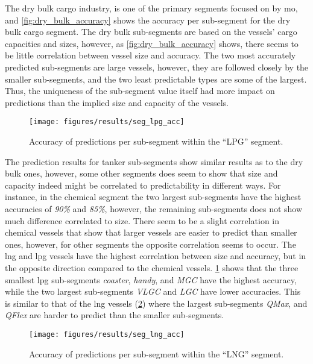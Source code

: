 The dry bulk cargo industry, is one of the primary segments focused on by \acrshort{mo}, and \cref{fig:dry_bulk_accuracy} shows the accuracy per sub-segment for the dry bulk cargo segment. The dry bulk sub-segments are based on the vessels' cargo capacities and sizes, however, as \cref{fig:dry_bulk_accuracy} shows, there seems to be little correlation between vessel size and accuracy. The two most accurately predicted sub-segments are large vessels, however, they are followed closely by the smaller sub-segments, and the two least predictable types are some of the largest. Thus, the uniqueness of the sub-segment value itself had more impact on predictions than the implied size and capacity of the vessels.

\begin{figure}[htbp]
    \centering
    \texttt{[image: figures/results/seg\_lpg\_acc]}
    \caption{Accuracy of predictions per sub-segment within the ``LPG'' segment.}
    \label{fig:lpg_accuracy}
\end{figure}

The prediction results for tanker sub-segments show similar results as to the dry bulk ones, however, some other segments does seem to show that size and capacity indeed might be correlated to predictability in different ways. For instance, in the chemical segment the two largest sub-segments have the highest accuracies of \textit{90\%} and \textit{85\%}, however, the remaining sub-segments does not show much difference correlated to size. There seem to be a slight correlation in chemical vessels that show that larger vessels are easier to predict than smaller ones, however, for other segments the opposite correlation seems to occur. The \acrfull{lng} and \acrfull{lpg} vessels have the highest correlation between size and accuracy, but in the opposite direction compared to the chemical vessels. \cref{fig:lpg_accuracy} shows that the three smallest \acrshort{lpg} sub-segments \textit{coaster}, \textit{handy}, and \textit{MGC} have the highest accuracy, while the two largest sub-segments \textit{VLGC} and \textit{LGC}  have lower accuracies. This is similar to that of the \acrshort{lng} vessels (\cref{fig:lng_accuracy}) where the largest sub-segments \textit{QMax}, and \textit{QFlex} are harder to predict than the smaller sub-segments.

\begin{figure}[htbp]
    \centering
    \texttt{[image: figures/results/seg\_lng\_acc]}
    \caption{Accuracy of predictions per sub-segment within the ``LNG'' segment.}
    \label{fig:lng_accuracy}
\end{figure}

